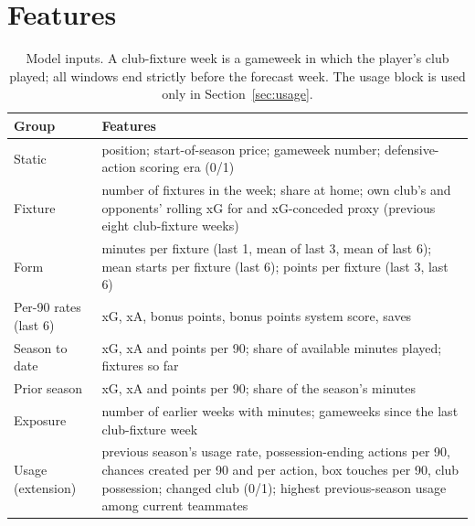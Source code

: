 \documentclass[11pt,a4paper]{article}
\begin{document}
\appendix
\section{Features}\label{app:features}

\begin{table}[ht]
\centering
\small
\caption{Model inputs. A club-fixture week is a gameweek in which the player's club played; all
windows end strictly before the forecast week. The usage block is used only in
Section~\ref{sec:usage}.}
\begin{tabularx}{\textwidth}{lX}
\toprule
Group & Features \\
\midrule
Static & position; start-of-season price; gameweek number; defensive-action scoring era (0/1) \\
Fixture & number of fixtures in the week; share at home; own club's and opponents' rolling xG for
          and xG-conceded proxy (previous eight club-fixture weeks) \\
Form & minutes per fixture (last 1, mean of last 3, mean of last 6); mean starts per fixture
       (last 6); points per fixture (last 3, last 6) \\
Per-90 rates (last 6) & xG, xA, bonus points, bonus points system score, saves \\
Season to date & xG, xA and points per 90; share of available minutes played; fixtures so far \\
Prior season & xG, xA and points per 90; share of the season's minutes \\
Exposure & number of earlier weeks with minutes; gameweeks since the last club-fixture week \\
Usage (extension) & previous season's usage rate, possession-ending actions per 90, chances
  created per 90 and per action, box touches per 90, club possession; changed club (0/1);
  highest previous-season usage among current teammates \\
\bottomrule
\end{tabularx}
\end{table}
\end{document}
